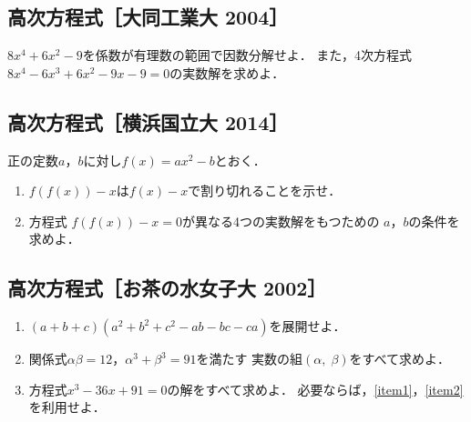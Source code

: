 \documentclass[../all/math-standard_questions_all.tex]{subfiles}
\begin{document}
\vspace{2cm}
\vfill

\subsection{高次方程式［大同工業大 2004］}

$8x^4+6x^2-9$を係数が有理数の範囲で因数分解せよ．
また，4次方程式$8x^4-6x^3+6x^2-9x-9=0$の実数解を求めよ．

\vspace{2cm}
\vfill

\subsection{高次方程式［横浜国立大 2014］}

正の定数$a$，$b$に対し$f(x)=ax^2-b$とおく．

\begin{enumerate}

    \item $f\left(f(x)\right)-x$は$f(x)-x$で割り切れることを示せ．

    \item 方程式 $f\left(f(x)\right)-x=0$が異なる4つの実数解をもつための
        $a$，$b$の条件を求めよ．

\end{enumerate}

\vspace{2cm}
\vfill

\subsection{高次方程式［お茶の水女子大 2002］}

\begin{enumerate}

    \item $(a+b+c)(a^2+b^2+c^2-ab-bc-ca)$を展開せよ．
        \label{item1}

    \item 関係式$\alpha\beta=12$，$\alpha^3+\beta^3=91$を満たす
        実数の組$(\alpha,\; \beta)$をすべて求めよ．
        \label{item2}

    \item 方程式$x^3-36x+91=0$の解をすべて求めよ．
        必要ならば，\!\!\ref{item1}\!\!\!\!，\!\!\!\ref{item2}\!\!\!を利用せよ．

\end{enumerate}

\vspace{2cm}
\vfill
\end{document}
